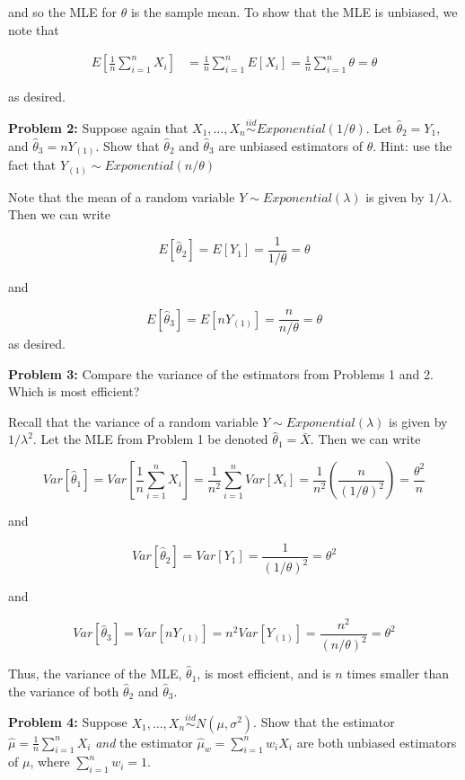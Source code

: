 \documentclass[
  letterpaper,
  DIV=11,
  numbers=noendperiod]{scrreprt}
\begin{document}
and so the MLE for \(\theta\) is the sample mean. To show that the MLE
is unbiased, we note that

\begin{align*}
    E \left[ \frac{1}{n} \sum_{i = 1}^n X_i \right] & = \frac{1}{n} \sum_{i = 1}^n E[X_i] = \frac{1}{n} \sum_{i = 1}^n \theta  = \theta
\end{align*}

as desired.

\textbf{Problem 2:} Suppose again that
\(X_1, \dots, X_n \overset{iid}{\sim} Exponential(1/\theta)\). Let
\(\hat{\theta}_2 = Y_1\), and \(\hat{\theta}_3 = nY_{(1)}\). Show that
\(\hat{\theta}_2\) and \(\hat{\theta}_3\) are unbiased estimators of
\(\theta\). Hint: use the fact that
\(Y_{(1)} \sim Exponential(n/\theta)\)

Note that the mean of a random variable \(Y \sim Exponential(\lambda)\)
is given by \(1/\lambda\). Then we can write

\[
E[\hat{\theta}_2] = E[Y_1] = \frac{1}{1/\theta} = \theta
\]

and

\[
E[\hat{\theta}_3] = E[nY_{(1)}] = \frac{n}{n/\theta} = \theta
\] as desired.

\textbf{Problem 3:} Compare the variance of the estimators from Problems
1 and 2. Which is most efficient?

Recall that the variance of a random variable
\(Y \sim Exponential(\lambda)\) is given by \(1/\lambda^2\). Let the MLE
from Problem 1 be denoted \(\hat{\theta}_1 = \bar{X}\). Then we can
write

\[
Var\left[\hat{\theta}_1\right] = Var\left[\frac{1}{n} \sum_{i = 1}^n X_i\right] = \frac{1}{n^2} \sum_{i = 1}^n Var[X_i] = \frac{1}{n^2} \left( \frac{n}{(1/\theta)^2} \right) = \frac{\theta^2}{n}
\]

and

\[
Var\left[\hat{\theta}_2\right] = Var[Y_1] = \frac{1}{(1/\theta)^2} = \theta^2
\]

and

\[
Var\left[\hat{\theta}_3\right] = Var[nY_{(1)}] = n^2 Var[Y_{(1)}] = \frac{n^2}{(n/\theta)^2} = \theta^2
\]

Thus, the variance of the MLE, \(\hat{\theta}_1\), is most efficient,
and is \(n\) times smaller than the variance of both \(\hat{\theta}_2\)
and \(\hat{\theta}_3\).

\textbf{Problem 4:} Suppose
\(X_1, \dots, X_n \overset{iid}{\sim} N(\mu, \sigma^2)\). Show that the
estimator \(\hat{\mu} = \frac{1}{n} \sum_{i = 1}^n X_i\) \emph{and} the
estimator \(\hat{\mu}_w = \sum_{i = 1}^n w_i X_i\) are both unbiased
estimators of \(\mu\), where \(\sum_{i = 1}^n w_i = 1\).
\end{document}
